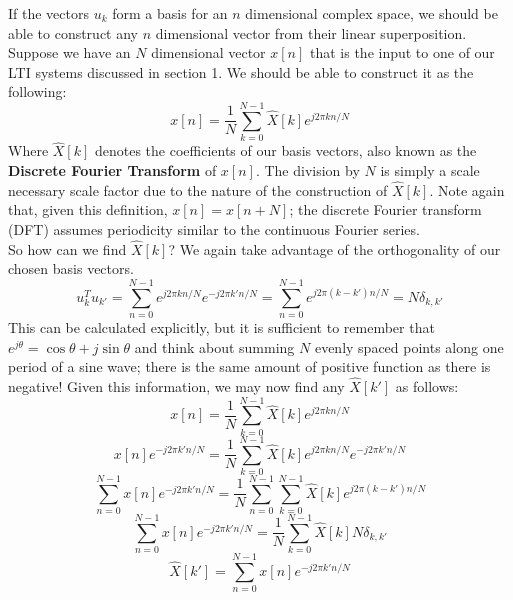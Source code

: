 \documentclass[a4paper]{article}
\numberwithin{equation}{section}
\begin{document}
If the vectors $u_k$ form a basis for an $n$ dimensional complex space, we should be able to construct any $n$ dimensional vector from their linear superposition. Suppose we have an $N$ dimensional vector $x[n]$ that is the input to one of our LTI systems discussed in section 1. We should be able to construct it as the following:
\begin{equation}
\boxed{
x[n]=\frac{1}{N}\sum_{k=0}^{N-1}\hat{X}[k]e^{j2\pi kn/N}}
\end{equation}
Where $\hat{X}[k]$ denotes the coefficients of our basis vectors, also known as the \textbf{Discrete Fourier Transform} of $x[n]$. The division by $N$ is simply a scale necessary scale factor due to the nature of the construction of $\hat{X}[k]$. Note again that, given this definition, $x[n]=x[n+N]$; the discrete Fourier transform (DFT) assumes periodicity similar to the continuous Fourier series. \\

So how can we find $\hat{X}[k]$? We again take advantage of the orthogonality of our chosen basis vectors. 
\begin{equation}
u_k^Tu_{k'} = \sum_{n=0}^{N-1}e^{j2\pi kn/N}e^{-j2\pi k' n/N}=\sum_{n=0}^{N-1}e^{j2\pi (k-k')n/N}=N\delta_{k,k'}
\end{equation}
This can be calculated explicitly, but it is sufficient to remember that $e^{j\theta}=\cos{\theta}+j\sin{\theta}$ and think about summing $N$ evenly spaced points along one period of a sine wave; there is the same amount of positive function as there is negative! Given this information, we may now find any $\hat{X}[k']$ as follows:
\begin{equation}
x[n]=\frac{1}{N}\sum_{k=0}^{N-1}\hat{X}[k]e^{j2\pi kn/N}
\end{equation}
\begin{equation}
x[n]e^{-j2\pi k' n/N}=\frac{1}{N}\sum_{k=0}^{N-1}\hat{X}[k]e^{j2\pi kn/N}e^{-j2\pi k' n/N}
\end{equation}
\begin{equation}
\sum_{n=0}^{N-1}x[n]e^{-j2\pi k' n/N}=\frac{1}{N}\sum_{n=0}^{N-1}\sum_{k=0}^{N-1}\hat{X}[k]e^{j2\pi (k-k')n/N}
\end{equation}
\begin{equation}
\sum_{n=0}^{N-1}x[n]e^{-j2\pi k' n/N}=\frac{1}{N}\sum_{k=0}^{N-1}\hat{X}[k]N\delta_{k,k'}
\end{equation}
\begin{equation}
\boxed{
\hat{X}[k']=\sum_{n=0}^{N-1}x[n]e^{-j2\pi k' n/N}}
\end{equation}
\end{document}
